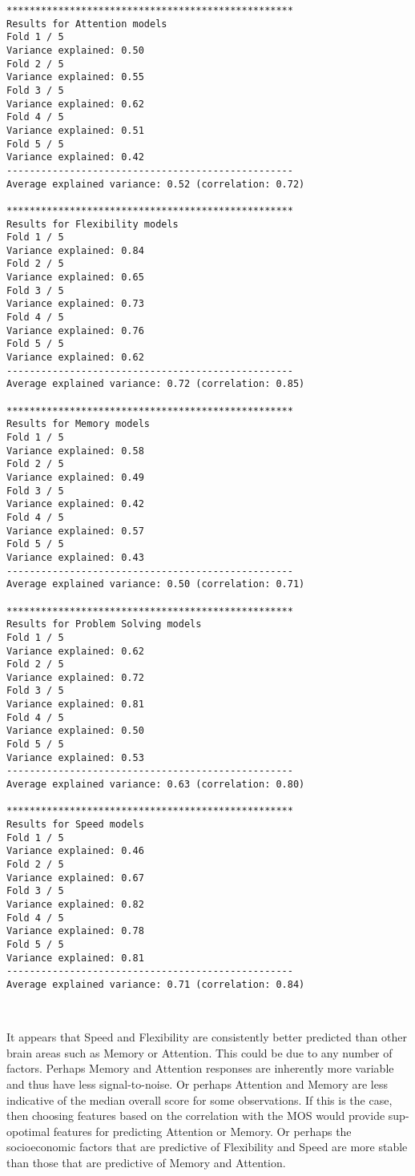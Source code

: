 \documentclass{article}
\begin{document}
    \begin{Verbatim}[commandchars=\\\{\}]
**************************************************
Results for Attention models
Fold 1 / 5
Variance explained: 0.50
Fold 2 / 5
Variance explained: 0.55
Fold 3 / 5
Variance explained: 0.62
Fold 4 / 5
Variance explained: 0.51
Fold 5 / 5
Variance explained: 0.42
--------------------------------------------------
Average explained variance: 0.52 (correlation: 0.72)

**************************************************
Results for Flexibility models
Fold 1 / 5
Variance explained: 0.84
Fold 2 / 5
Variance explained: 0.65
Fold 3 / 5
Variance explained: 0.73
Fold 4 / 5
Variance explained: 0.76
Fold 5 / 5
Variance explained: 0.62
--------------------------------------------------
Average explained variance: 0.72 (correlation: 0.85)

**************************************************
Results for Memory models
Fold 1 / 5
Variance explained: 0.58
Fold 2 / 5
Variance explained: 0.49
Fold 3 / 5
Variance explained: 0.42
Fold 4 / 5
Variance explained: 0.57
Fold 5 / 5
Variance explained: 0.43
--------------------------------------------------
Average explained variance: 0.50 (correlation: 0.71)

**************************************************
Results for Problem Solving models
Fold 1 / 5
Variance explained: 0.62
Fold 2 / 5
Variance explained: 0.72
Fold 3 / 5
Variance explained: 0.81
Fold 4 / 5
Variance explained: 0.50
Fold 5 / 5
Variance explained: 0.53
--------------------------------------------------
Average explained variance: 0.63 (correlation: 0.80)

**************************************************
Results for Speed models
Fold 1 / 5
Variance explained: 0.46
Fold 2 / 5
Variance explained: 0.67
Fold 3 / 5
Variance explained: 0.82
Fold 4 / 5
Variance explained: 0.78
Fold 5 / 5
Variance explained: 0.81
--------------------------------------------------
Average explained variance: 0.71 (correlation: 0.84)
    \end{Verbatim}

    \begin{center}
    \end{center}
    { \hspace*{\fill} \\}
    
    It appears that Speed and Flexibility are consistently better predicted
than other brain areas such as Memory or Attention. This could be due to
any number of factors. Perhaps Memory and Attention responses are
inherently more variable and thus have less signal-to-noise. Or perhaps
Attention and Memory are less indicative of the median overall score for
some observations. If this is the case, then choosing features based on
the correlation with the MOS would provide sup-opotimal features for
predicting Attention or Memory. Or perhaps the socioeconomic factors
that are predictive of Flexibility and Speed are more stable than those
that are predictive of Memory and Attention.
\end{document}

